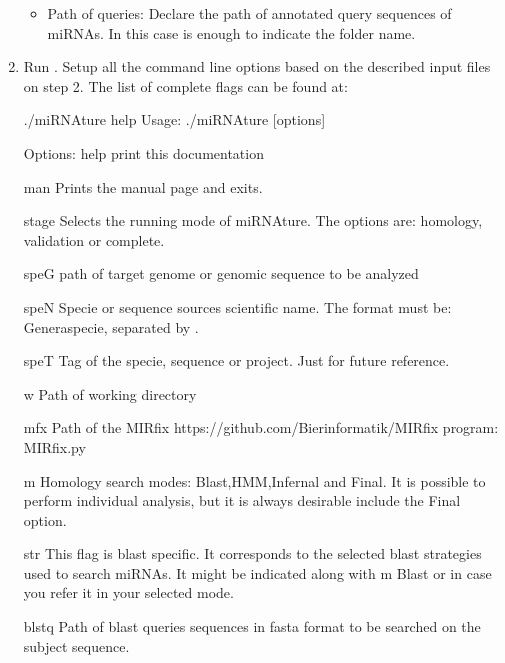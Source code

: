 \documentclass[letterpaper,10pt,english]{sphinxmanual}
\begin{document}
\begin{enumerate}
\begin{itemize}
\item {} 
Path of  queries: Declare the path of annotated query sequences of
miRNAs. In this case is enough to indicate the folder name.

\end{itemize}

\item {} 
Run . Setup all the command line options based on the described
input files on step 2. The list of complete flags can be found at:

\begin{sphinxVerbatim}[commandchars=\\\{\}]
\PYGZdl{} ./miRNAture \PYGZhy{}\PYGZhy{}help
Usage:
./miRNAture [\PYGZhy{}options]

Options:
\PYGZhy{}help       print this documentation

\PYGZhy{}man        Prints the manual page and exits.

\PYGZhy{}stage      Selects the running mode of miRNAture. The options are:
            \PYGZsq{}homology\PYGZsq{}, \PYGZsq{}validation\PYGZsq{} or \PYGZsq{}complete\PYGZsq{}.

\PYGZhy{}speG       path of target genome or genomic sequence to be analyzed

\PYGZhy{}speN       Specie or sequence source\PYGZsq{}s scientific name. The format must
            be: Genera\PYGZus{}specie, separated by \PYGZsq{}\PYGZus{}\PYGZsq{}.

\PYGZhy{}speT       Tag of the specie, sequence or project. Just for future
            reference.

\PYGZhy{}w          Path of working directory

\PYGZhy{}mfx        Path of the MIRfix
            \PYGZlt{}https://github.com/Bierinformatik/MIRfix\PYGZgt{} program:
            \PYGZdq{}MIRfix.py\PYGZdq{}

\PYGZhy{}m          Homology search modes: Blast,HMM,Infernal and Final. It is
            possible to perform individual analysis, but it is always
            desirable include the Final option.

\PYGZhy{}str        This flag is blast specific. It corresponds to the selected
            blast strategies used to search miRNAs. It might be
            indicated along with \PYGZhy{}m Blast or in case you refer it in
            your selected mode.

\PYGZhy{}blstq      Path of blast queries sequences in fasta format to be
            searched on the subject sequence.
\end{sphinxVerbatim}

\end{enumerate}
\end{document}
